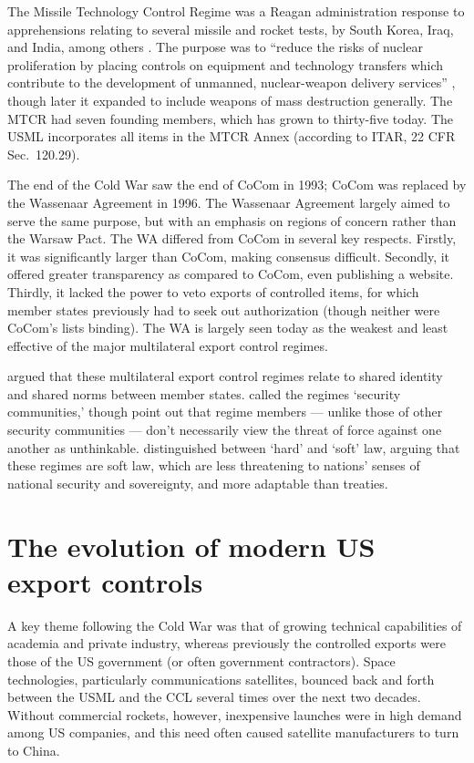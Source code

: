 \documentclass[12pt]{olfmemo}
\begin{document}
The Missile Technology Control Regime was a Reagan administration response to apprehensions relating to several missile and rocket tests, by South Korea, Iraq, and India, among others \citep{Scheffran1992}. The purpose was to ``reduce the risks of nuclear proliferation by placing controls on equipment and technology transfers which contribute to the development of unmanned, nuclear-weapon delivery services'' \citep{Fialka1987}, though later it expanded to include weapons of mass destruction generally. The MTCR had seven founding members, which has grown to thirty-five today. The USML incorporates all items in the MTCR Annex (according to ITAR, 22 CFR Sec.~120.29).

The end of the Cold War saw the end of CoCom in 1993; CoCom was replaced by the Wassenaar Agreement in 1996. The Wassenaar Agreement largely aimed to serve the same purpose, but with an emphasis on regions of concern rather than the Warsaw Pact. The WA differed from CoCom in several key respects. Firstly, it was significantly larger than CoCom, making consensus difficult. Secondly, it offered greater transparency as compared to CoCom, even publishing a website. Thirdly, it lacked the power to veto exports of controlled items, for which member states previously had to seek out authorization (though neither were CoCom's lists binding). The WA is largely seen today as the weakest and least effective of the major multilateral export control regimes.

\citet{Lipson1999} argued that these multilateral export control regimes relate to shared identity and shared norms between member states. \citet{Joyner2004} called the regimes `security communities,' though \citet{Beck2019} point out that regime members --- unlike those of other security communities --- don't necessarily view the threat of force against one another as unthinkable. \citet{Abbott2000} distinguished between `hard' and `soft' law, arguing that these regimes are soft law, which are less threatening to nations' senses of national security and sovereignty, and more adaptable than treaties.

\section{The evolution of modern US export controls}

A key theme following the Cold War was that of growing technical capabilities of academia and private industry, whereas previously the controlled exports were those of the US government (or often government contractors). Space technologies, particularly communications satellites, bounced back and forth between the USML and the CCL several times over the next two decades. Without commercial rockets, however, inexpensive launches were in high demand among US companies, and this need often caused satellite manufacturers to turn to China.
\end{document}
